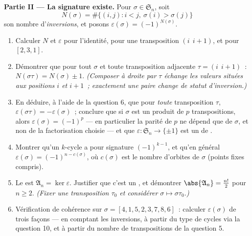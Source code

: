 \begin{problem}
\medskip
\noindent\textbf{Partie II --- La signature existe.} Pour $\sigma
\in \mathfrak S_n$, soit
\[
N(\sigma) = \#\bigl\{(i, j) : i < j,\ \sigma(i) >
\sigma(j)\bigr\}
\]
son nombre d'\emph{inversions}, et posons $\varepsilon(\sigma) =
(-1)^{N(\sigma)}$.
\begin{enumerate}[resume]
  \item Calculer $N$ et $\varepsilon$ pour l'identité, pour une
        transposition $(i\ \ i{+}1)$, et pour $[2, 3, 1]$.
  \item Démontrer que pour tout $\sigma$ et toute transposition
        adjacente $\tau = (i\ \ i{+}1)$~:
        $N(\sigma\tau) = N(\sigma) \pm 1$. \emph{(Composer à droite
        par $\tau$ échange les valeurs situées aux positions $i$ et
        $i + 1$~; exactement une paire change de statut
        d'inversion.)}
  \item En déduire, à l'aide de la question 6, que pour
        \emph{toute} transposition $\tau$, $\varepsilon(\sigma\tau) =
        -\varepsilon(\sigma)$~; conclure que si $\sigma$ est un
        produit de $p$ transpositions, alors $\varepsilon(\sigma)
        = (-1)^p$ --- en particulier la parité de $p$ ne dépend que
        de $\sigma$, et non de la factorisation choisie --- et que
        $\varepsilon \colon \mathfrak S_n \to \{\pm 1\}$ est un
         de .
  \item Montrer qu'un $k$-cycle a pour signature $(-1)^{k-1}$, et
        qu'en général $\varepsilon(\sigma) = (-1)^{n -
        c(\sigma)}$, où $c(\sigma)$ est le nombre d'orbites de
        $\sigma$ (points fixes compris).
  \item Le \emph{} est $\mathfrak A_n =
        \ker\varepsilon$. Justifier que c'est un , et
        démontrer $\abs{\mathfrak A_n} = \frac{n!}2$ pour $n \geq 2$.
        \emph{(Fixer une transposition $\tau_0$ et considérer $\sigma
        \mapsto \sigma\tau_0$.)}
  \item Vérification de cohérence sur $\sigma = [4, 1, 5, 2, 3, 7, 8, 6]$~:
        calculer $\varepsilon(\sigma)$ de trois façons --- en comptant
        les inversions, à partir du type de cycles via la question 10,
        et à partir du nombre de transpositions de la question 5.
\end{enumerate}


\end{problem}
